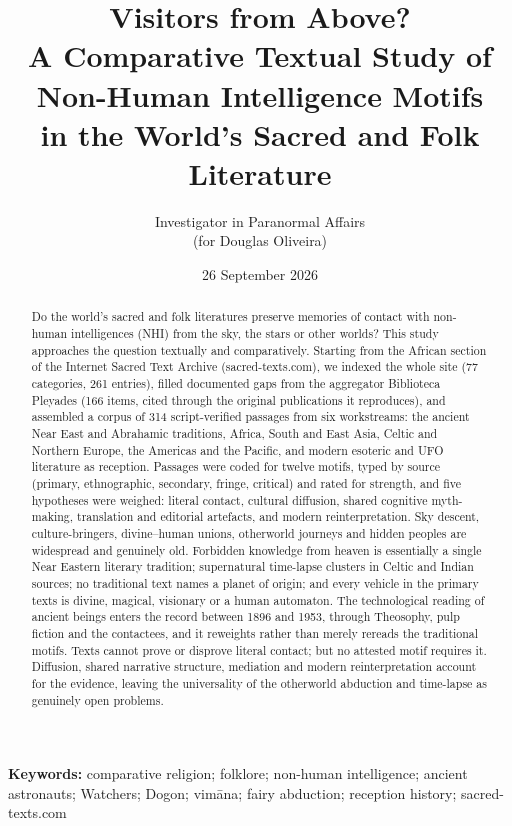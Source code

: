 \documentclass[11pt,a4paper]{article}
\title{Visitors from Above?\\[0.3em]\large A Comparative Textual Study of Non-Human Intelligence Motifs\\ in the World's Sacred and Folk Literature}
\author{Investigator in Paranormal Affairs\\ \small(for Douglas Oliveira)}
\date{26 September 2026}
\begin{document}
\maketitle

\begin{abstract}
\noindent
Do the world's sacred and folk literatures preserve memories of contact with non-human intelligences (NHI) from the sky, the stars or other worlds? This study approaches the question textually and comparatively. Starting from the African section of the Internet Sacred Text Archive (sacred-texts.com), we indexed the whole site (77 categories, 261 entries), filled documented gaps from the aggregator Biblioteca Pleyades (166 items, cited through the original publications it reproduces), and assembled a corpus of 314 script-verified passages from six workstreams: the ancient Near East and Abrahamic traditions, Africa, South and East Asia, Celtic and Northern Europe, the Americas and the Pacific, and modern esoteric and UFO literature as reception. Passages were coded for twelve motifs, typed by source (primary, ethnographic, secondary, fringe, critical) and rated for strength, and five hypotheses were weighed: literal contact, cultural diffusion, shared cognitive myth-making, translation and editorial artefacts, and modern reinterpretation. Sky descent, culture-bringers, divine–human unions, otherworld journeys and hidden peoples are widespread and genuinely old. Forbidden knowledge from heaven is essentially a single Near Eastern literary tradition; supernatural time-lapse clusters in Celtic and Indian sources; no traditional text names a planet of origin; and every vehicle in the primary texts is divine, magical, visionary or a human automaton. The technological reading of ancient beings enters the record between 1896 and 1953, through Theosophy, pulp fiction and the contactees, and it reweights rather than merely rereads the traditional motifs. Texts cannot prove or disprove literal contact; but no attested motif requires it. Diffusion, shared narrative structure, mediation and modern reinterpretation account for the evidence, leaving the universality of the otherworld abduction and time-lapse as genuinely open problems.
\end{abstract}

\vspace{0.5em}
\noindent\textbf{Keywords:} comparative religion; folklore; non-human intelligence; ancient astronauts; Watchers; Dogon; vimāna; fairy abduction; reception history; sacred-texts.com
\end{document}
